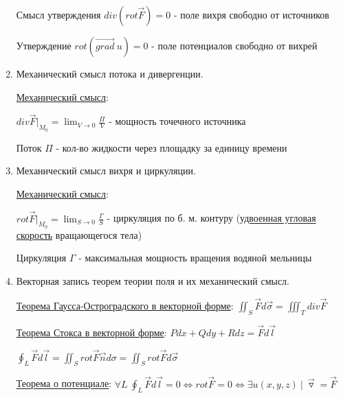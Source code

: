 \documentclass[12pt]{article}
\begin{document}
\begin{enumerate}
        Смысл утверждения $div (rot \overrightarrow F) = 0$ - поле вихря свободно от источников

        Утверждение $rot (\overrightarrow{grad}\ u) = 0$ - поле потенциалов свободно от вихрей


        \item Механический смысл потока и дивергенции.

        \hyperlink{divergencemechanicalmeaning}{Механический смысл}:

        $div \overrightarrow{F} \Big|_{M_0} = \lim_{V \to 0} \frac{\Pi}{V}$ - мощность точечного источника

        Поток $\Pi$ - кол-во жидкости через площадку за единицу времени


        \item Механический смысл вихря и циркуляции.

        \hyperlink{rotormechanicalmeaning}{Механический смысл}:

        $rot \overrightarrow{F} \Big|_{M_0} = \lim_{S \to 0} \frac{\Gamma}{S}$ - циркуляция по б. м. контуру (\hyperlink{rotormechanicalmeaning2}{удвоенная угловая скорость} вращающегося тела)

        Циркуляция $\Gamma$ - максимальная мощность вращения водяной мельницы


        \item Векторная запись теорем теории поля и их механический смысл.

        \hyperlink{gaussostrogradskyyvector}{Теорема Гаусса-Остроградского в векторной форме}: $\iint_S \overrightarrow{F} d\overrightarrow{\sigma} = \iiint_T div \overrightarrow{F}$

        \hyperlink{theoremGaussOstrogradskyyinvectorform}{Теорема Стокса в векторной форме}: $Pdx + Qdy + Rdz = \overrightarrow{F}d\overrightarrow{l}$

        $\oint_L \overrightarrow{F}d\overrightarrow{l} = \iint_S rot \overrightarrow{F} \overrightarrow{n} d\sigma = \iint_S rot \overrightarrow{F} d\overrightarrow{\sigma}$

        \hyperlink{theoremaboutpotentialinvectorform}{Теорема о потенциале}: $\forall L \ \oint_L \overrightarrow{F}d\overrightarrow{l} = 0 \Longleftrightarrow rot \overrightarrow{F} = 0 \Longleftrightarrow \exists u(x, y, z) \ | \ \overrightarrow{\triangledown} = \overrightarrow{F}$


    \end{enumerate}
\end{document}
